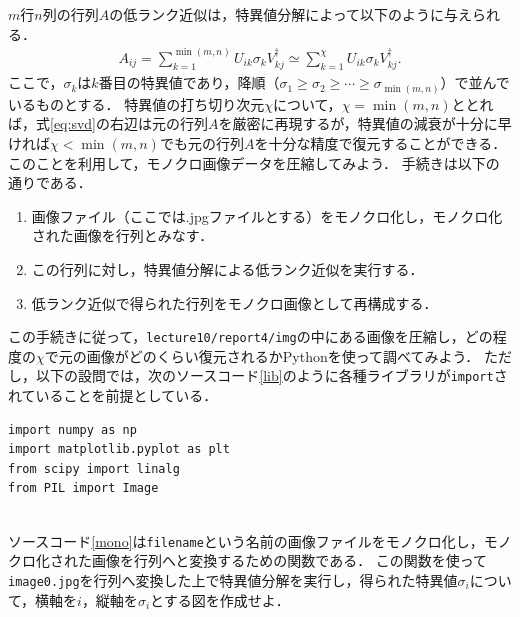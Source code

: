 \documentclass[a4paper,12pt]{jsarticle}
\begin{document}
\section{}
\label{sec:problem_2}

$m$行$n$列の行列$A$の低ランク近似は，特異値分解によって以下のように与えられる．
\begin{align}
\label{eq:svd}
    A_{ij}
    =
    \sum_{k=1}^{\min(m,n)}
    U_{ik}\sigma_{k}V^{\dag}_{kj}
    \simeq
    \sum_{k=1}^{\chi}
    U_{ik}\sigma_{k}V^{\dag}_{kj}
    .
\end{align}
ここで，$\sigma_{k}$は$k$番目の特異値であり，降順（$\sigma_{1}\ge\sigma_{2}\ge\cdots\ge\sigma_{\min(m,n)}$）で並んでいるものとする．
特異値の打ち切り次元$\chi$について，$\chi=\min(m,n)$ととれば，式\eqref{eq:svd}の右辺は元の行列$A$を厳密に再現するが，特異値の減衰が十分に早ければ$\chi<\min(m,n)$でも元の行列$A$を十分な精度で復元することができる．
このことを利用して，モノクロ画像データを圧縮してみよう．
手続きは以下の通りである．

\clearpage

\begin{enumerate}
    \item 画像ファイル（ここでは.jpgファイルとする）をモノクロ化し，モノクロ化された画像を行列とみなす．
    \item この行列に対し，特異値分解による低ランク近似を実行する．
    \item 低ランク近似で得られた行列をモノクロ画像として再構成する．
\end{enumerate}

この手続きに従って，\texttt{lecture10/report4/img}の中にある画像を圧縮し，どの程度の$\chi$で元の画像がどのくらい復元されるかPythonを使って調べてみよう．
ただし，以下の設問では，次のソースコード\ref{lib}のように各種ライブラリが\texttt{import}されていることを前提としている．\\
\begin{lstlisting}[caption=本課題で必要なライブラリの\texttt{import},label=lib]
import numpy as np
import matplotlib.pyplot as plt
from scipy import linalg
from PIL import Image
\end{lstlisting}
~\\

ソースコード\ref{mono}は\texttt{filename}という名前の画像ファイルをモノクロ化し，モノクロ化された画像を行列へと変換するための関数である．
この関数を使って\texttt{image0.jpg}を行列へ変換した上で特異値分解を実行し，得られた特異値$\sigma_{i}$について，横軸を$i$，縦軸を$\sigma_{i}$とする図を作成せよ．
\end{document}
